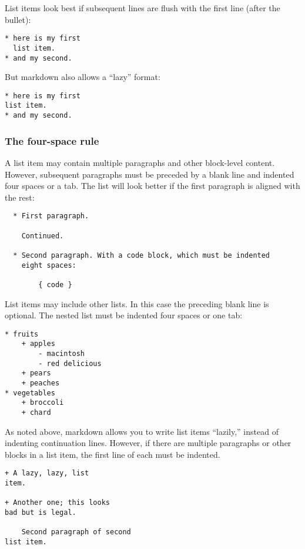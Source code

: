 \documentclass[]{article}
\begin{document}
List items look best if subsequent lines are flush with the first line
(after the bullet):

\begin{verbatim}
* here is my first
  list item.
* and my second.
\end{verbatim}

But markdown also allows a ``lazy'' format:

\begin{verbatim}
* here is my first
list item.
* and my second.
\end{verbatim}

\subsubsection{The four-space rule}

A list item may contain multiple paragraphs and other block-level
content. However, subsequent paragraphs must be preceded by a blank line
and indented four spaces or a tab. The list will look better if the
first paragraph is aligned with the rest:

\begin{verbatim}
  * First paragraph.

    Continued.

  * Second paragraph. With a code block, which must be indented
    eight spaces:

        { code }
\end{verbatim}

List items may include other lists. In this case the preceding blank
line is optional. The nested list must be indented four spaces or one
tab:

\begin{verbatim}
* fruits
    + apples
        - macintosh
        - red delicious
    + pears
    + peaches
* vegetables
    + broccoli
    + chard
\end{verbatim}

As noted above, markdown allows you to write list items ``lazily,''
instead of indenting continuation lines. However, if there are multiple
paragraphs or other blocks in a list item, the first line of each must
be indented.

\begin{verbatim}
+ A lazy, lazy, list
item.

+ Another one; this looks
bad but is legal.

    Second paragraph of second
list item.
\end{verbatim}
\end{document}

